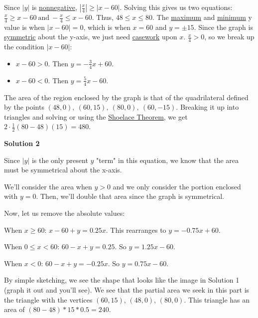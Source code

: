 \begin{enumerate}
 Since $|y|$ is \href{https://artofproblemsolving.com/wiki/index.php?title=Nonnegative}{nonnegative}, $\left|\frac{x}{4}\right| \ge |x - 60|$. Solving this gives us two equations: $\frac{x}{4} \ge x - 60\ \mathrm{and} \ -\frac{x}{4} \le x - 60$. Thus, $48 \le x \le 80$. The \href{https://artofproblemsolving.com/wiki/index.php?title=Maximum}{maximum} and \href{https://artofproblemsolving.com/wiki/index.php?title=Minimum}{minimum} y value is when $|x - 60| = 0$, which is when $x = 60$ and $y = \pm 15$. Since the graph is \href{https://artofproblemsolving.com/wiki/index.php?title=Symmetry}{symmetric} about the y-axis, we just need \href{https://artofproblemsolving.com/wiki/index.php?title=Casework}{casework} upon $x$. $\frac{x}{4} > 0$, so we break up the condition $|x-60|$:

 
            \begin{itemize}
        \item $x - 60 > 0$. Then $y = -\frac{3}{4}x+60$.
        \item $x - 60 < 0$. Then $y = \frac{5}{4}x-60$.
            \end{itemize}
            The area of the region enclosed by the graph is that of the quadrilateral defined by the points $(48,0),\ (60,15),\ (80,0), \ (60,-15)$. Breaking it up into triangles and solving or using the \href{https://artofproblemsolving.com/wiki/index.php?title=Shoelace\_Theorem}{Shoelace Theorem}, we get $2 \cdot \frac{1}{2}(80 - 48)(15) = \boxed{480}$.

 



\textbf{Solution 2}

Since $|y|$ is the only present $y$ "term" in this equation, we know that the area must be symmetrical about the x-axis.

 We'll consider the area when $y>0$ and we only consider the portion enclosed with $y=0$. Then, we'll double that area since the graph is symmetrical. 

 Now, let us remove the absolute values: 

 When $x\ge 60$: $x-60+y=0.25x$. This rearranges to $y=-0.75x+60$.

 When $0\le x<60$: $60-x+y=0.25$. So $y=1.25x-60$.

 When $x<0$: $60-x+y=-0.25x$. So $y=0.75x-60$.

 By simple sketching, we see the shape that looks like the image in Solution 1 (graph it out and you'll see). We see that the partial area we seek in this part is the triangle with the vertices $(60,15)$, $(48,0)$, $(80,0)$. This triangle has an area of $(80-48)*15*0.5=240$. 


\end{enumerate}
